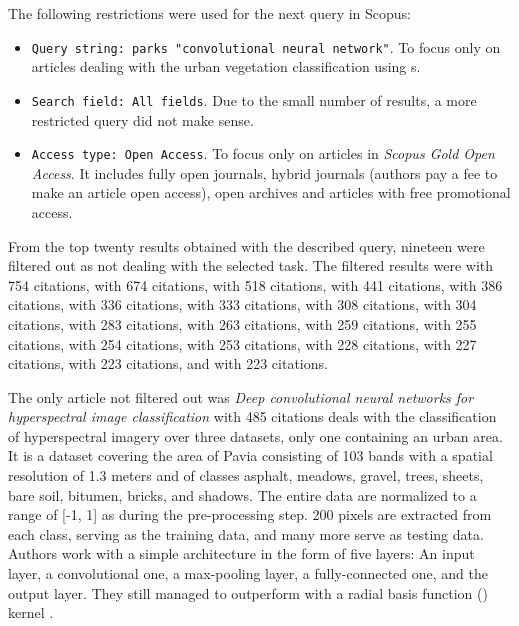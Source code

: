 The following restrictions were used for the next query in Scopus:

\begin{itemize}
	\item \verb|Query string: parks "convolutional neural network"|. To fo\-cus on\-ly on articles dealing with the urban vegetation classification using s.
	\item \verb|Search field: All fields|. Due to the small number of results, a more restricted query did not make sense.
	\item \verb|Access type: Open Access|. To focus only on articles in \textit{Scopus Gold Open Access}. It includes fully open journals, hybrid journals (authors pay a fee to make an article open access), open archives and articles with free promotional access.
\end{itemize}

\noindent From the top twenty results obtained with the described query, nineteen were filtered out as not dealing with the selected task. The filtered results were \cite{dl-dna-rna} with 754 citations, \cite{lstm-activity} with 674 citations, \cite{visual-genom} with 518 citations, \cite{dl-computational-biology} with 441 citations, \cite{text-detection-imagery} with 386 citations, \cite{opportunities-biology-medicine} with 336 citations, \cite{neuromorphic-computing} with 333 citations, \cite{cnn-traffic} with 308 citations, \cite{dnn-plant-diseases} with 304 citations, \cite{dl-for-cv} with 283 citations, \cite{face-classification} with 263 citations, \cite{human-transcription-factors} with 259 citations, \cite{ecg-heartbeat} with 255 citations, \cite{ml-medical-imaging} with 254 citations, \cite{visual-question-answering} with 253 citations, \cite{soli} with 228 citations, \cite{cnn-neuromorphic-computing} with 227 citations, \cite{dl-fault-diagnosis} with 223 citations, and \cite{basset} with 223 citations.

The only article not filtered out was \textit{Deep convolutional neural networks for hyperspectral image classification} \cite{cnn-hs} with 485 citations deals with the classification of hyperspectral imagery over three datasets, only one containing an urban area. It is a dataset covering the area of Pavia consisting of 103 bands with a spatial resolution of 1.3 meters and of classes asphalt, meadows, gravel, trees, sheets, bare soil, bitumen, bricks, and shadows. The entire data are normalized to a range of [-1, 1] as during the pre-processing step. 200 pixels are extracted from each class, serving as the training data, and many more serve as testing data. Authors work with a simple  architecture in the form of five layers: An input layer, a convolutional one, a max-pooling layer, a fully-connected one, and the output layer. They still managed to outperform  with a radial basis function () kernel \cite{rbf-kernel}.

